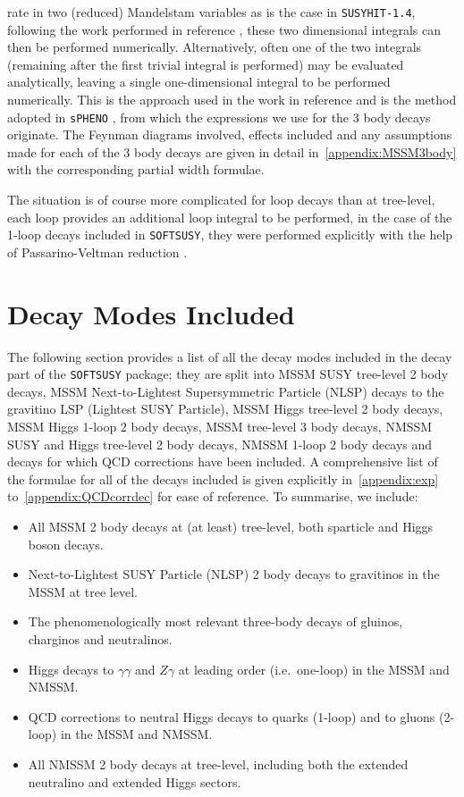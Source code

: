 \documentclass[final,3p,times,pdflatex]{elsarticle}
\begin{document}
rate in two (reduced) Mandelstam variables as is the case in {\tt SUSYHIT-1.4},
following the work performed in reference \cite{Mambrini:2001}, these
two dimensional integrals can then be performed numerically. Alternatively, often
one of the two integrals (remaining after the first trivial integral is 
performed) may be evaluated analytically, leaving a single one-dimensional
integral to be performed numerically. This is the approach used in the work
in reference \cite{Baer:1998} and is the method adopted in {\tt sPHENO} 
\cite{Porod:2003um, Porod:2011}, from which the expressions we use
for the 3 body decays originate. The Feynman diagrams involved, effects
included and any assumptions made for each of the 3 body decays are 
given in detail in~\ref{appendix:MSSM3body} with the corresponding partial
width formulae.

The situation is of course more complicated for loop decays than at tree-level,
each loop provides an additional loop integral to be performed, in the case
of the 1-loop decays included in {\tt SOFTSUSY},  they were performed
explicitly with the help of Passarino-Veltman reduction \cite{Passarino:1979}.

\section{Decay Modes Included \label{sec:list}}
The following section provides a list of all the decay modes included in the
decay part of the {\tt SOFTSUSY} package; they are split into MSSM SUSY
tree-level 2 body decays, MSSM Next-to-Lightest Supersymmetric Particle (NLSP) decays
to the gravitino LSP (Lightest SUSY Particle), MSSM Higgs tree-level 2 body decays, MSSM Higgs
1-loop 2 body decays, MSSM tree-level 3 body decays,  NMSSM SUSY and Higgs tree-level 2 body decays, NMSSM
1-loop 2 body decays and decays for which QCD corrections have been
included. A comprehensive list of the formulae for all of the decays included
is given explicitly in~\ref{appendix:exp} to~\ref{appendix:QCDcorrdec} for
ease of reference. To summarise, we include:
\begin{itemize}
\item All MSSM 2 body decays at (at least) tree-level, both sparticle and
  Higgs boson decays. 
\item Next-to-Lightest SUSY Particle (NLSP) 2 body decays to gravitinos in the
  MSSM at tree level.
\item The phenomenologically most relevant three-body decays of gluinos, charginos and neutralinos.
\item Higgs decays to $\gamma\gamma$ and $Z\gamma$ at leading order (i.e.\ one-loop) in the MSSM and NMSSM.
\item QCD corrections to neutral Higgs decays to quarks (1-loop) and to gluons (2-loop) in the MSSM and NMSSM.
\item All NMSSM 2 body decays at tree-level, including both the extended neutralino and extended Higgs sectors.
\end{itemize}
\end{document}
